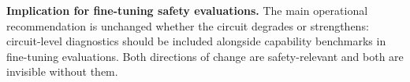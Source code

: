 \textbf{Implication for fine-tuning safety evaluations.}
The main operational recommendation is unchanged whether the circuit
degrades or strengthens: circuit-level diagnostics should be included
alongside capability benchmarks in fine-tuning evaluations. Both directions
of change are safety-relevant and both are invisible without them.
